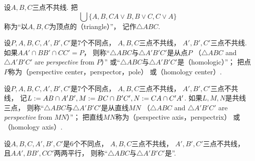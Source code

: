 
\begin{definition}
设\(A,B,C\)三点不共线.
把\begin{equation*}
	\bigcup\{
		A,B,C
		A \vee B,
		B \vee C,
		C \vee A
	\}
\end{equation*}
称为“以\(A,B,C\)为顶点的（triangle）”，
记作\(\triangle ABC\).
\end{definition}

\begin{definition}
设\(P,A,B,C,A',B',C'\)是7个不同点，
\(A,B,C\)三点不共线，
\(A',B',C'\)三点不共线.
如果\(AA' \cap BB' \cap CC' = P\)，
则称“\(\triangle ABC\)与\(\triangle A'B'C'\)是从点\(P\) （\(\triangle ABC\) and \(\triangle A'B'C'\) are \emph{perspective} from \(P\)）”
或“\(\triangle ABC\)与\(\triangle A'B'C'\)是（homologic）”；
把点\(P\)称为（perspective center，perspector，pole）
或（homology center）.
\end{definition}

\begin{definition}
设\(P,A,B,C,A',B',C'\)是7个不同点，
\(A,B,C\)三点不共线，
\(A',B',C'\)三点不共线，
记\(
	L := AB \cap A'B',
	M := BC \cap B'C',
	N := CA \cap C'A'
\).
如果\(L,M,N\)是共线三点，
则称“\(\triangle ABC\)与\(\triangle A'B'C'\)是从直线\(MN\) （\(\triangle ABC\) and \(\triangle A'B'C'\) are \emph{perspective} from \(MN\)）”；
把直线\(MN\)称为（perspective axis，perspectrix）
或（homology axis）.
\end{definition}

\begin{definition}
设\(A,B,C,A',B',C'\)是6个不同点，
\(A,B,C\)三点不共线，
\(A',B',C'\)三点不共线，
且\(AA',BB',CC'\)两两平行，
则称“\(\triangle ABC\)与\(\triangle A'B'C'\)是”.
\end{definition}

